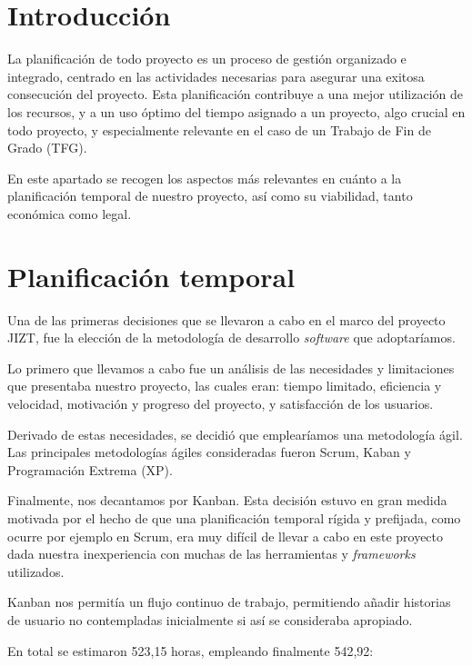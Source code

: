 
\section{Introducción}

La planificación de todo proyecto es un proceso de gestión organizado e integrado, centrado en las actividades necesarias para asegurar una exitosa consecución del proyecto. Esta planificación contribuye a una mejor utilización de los recursos, y a un uso óptimo del tiempo asignado a un proyecto, algo crucial en todo proyecto, y especialmente relevante en el caso de un Trabajo de Fin de Grado (TFG).

En este apartado se recogen los aspectos más relevantes en cuánto a la planificación temporal de nuestro proyecto, así como su viabilidad, tanto económica como legal.

\vspace{1cm}
\section{Planificación temporal}

Una de las primeras decisiones que se llevaron a cabo en el marco del proyecto JIZT, fue la elección de la metodología de desarrollo \emph{software} que adoptaríamos.

Lo primero que llevamos a cabo fue un análisis de las necesidades y limitaciones que presentaba nuestro proyecto, las cuales eran: tiempo limitado, eficiencia y velocidad, motivación y progreso del proyecto, y satisfacción de los usuarios.

Derivado de estas necesidades, se decidió que emplearíamos una metodología ágil. Las principales metodologías ágiles consideradas fueron Scrum, Kaban y Programación Extrema (XP).

Finalmente, nos decantamos por Kanban. Esta decisión estuvo en gran medida motivada por el hecho de que una planificación temporal rígida y prefijada, como ocurre por ejemplo en Scrum, era muy difícil de llevar a cabo en este proyecto dada nuestra inexperiencia con muchas de las herramientas y \emph{frameworks} utilizados.

Kanban nos permitía un flujo continuo de trabajo, permitiendo añadir historias de usuario no contempladas inicialmente si así se consideraba apropiado.

En total se estimaron 523,15 horas, empleando finalmente 542,92:

